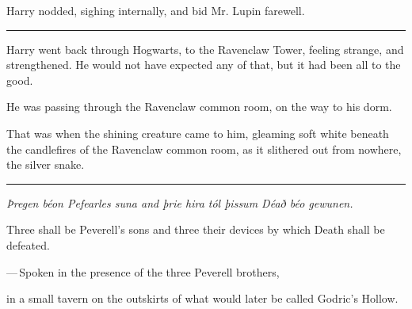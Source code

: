 Harry nodded, sighing internally, and bid Mr. Lupin farewell.

\begin{center}\rule{3in}{0.4pt}\end{center}

Harry went back through Hogwarts, to the Ravenclaw Tower, feeling strange, and strengthened. He would not have expected any of that, but it had been all to the good.

He was passing through the Ravenclaw common room, on the way to his dorm.

That was when the shining creature came to him, gleaming soft white beneath the candlefires of the Ravenclaw common room, as it slithered out from nowhere, the silver snake.

\begin{center}\rule{3in}{0.4pt}\end{center}

\emph{Þregen béon Pefearles suna and þrie hira tól þissum Déað béo gewunen.}

Three shall be Peverell's sons and three their devices by which Death shall be defeated.

---\,Spoken in the presence of the three Peverell brothers,

in a small tavern on the outskirts of what would later be called Godric's Hollow.
